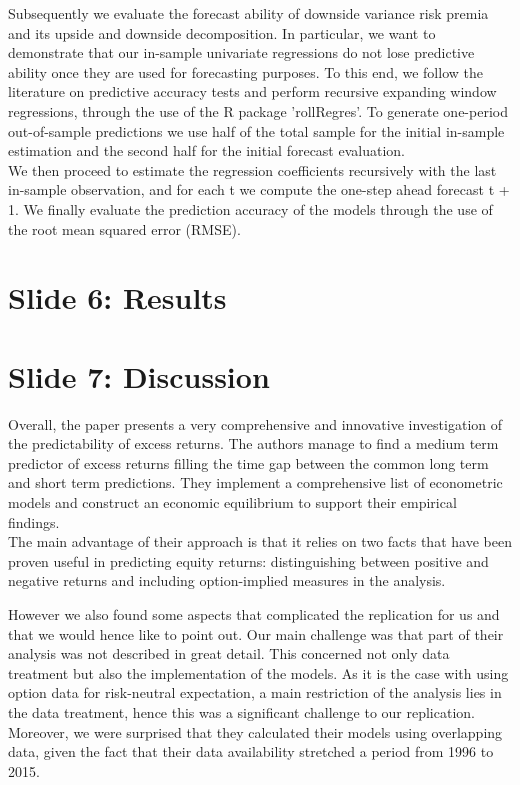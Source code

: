 \documentclass[12pt, letterpaper]{article}
\begin{document}
\vspace{3mm}
\noindent
Subsequently we evaluate the forecast ability of downside variance risk premia and its upside and downside decomposition. In particular, we want to demonstrate that our in-sample univariate regressions do not lose predictive ability once they are used for forecasting purposes.
To this end, we follow the literature on predictive accuracy tests and perform recursive
expanding window regressions, through the use of the R package ’rollRegres’. To generate
one-period out-of-sample predictions we use half of the total sample for
the initial in-sample estimation and the second half for the initial forecast evaluation. \\
We then proceed to estimate the regression coefficients recursively with the last in-sample observation, and for each t we compute the one-step ahead forecast t + 1.
We finally evaluate the prediction accuracy of the models through the use of the root mean squared error (RMSE).

\section{Slide 6: Results}

\section{Slide 7: Discussion}
Overall, the paper presents a very comprehensive and innovative investigation of the predictability of excess returns. The authors manage to find a medium term predictor of excess returns filling the time gap between the common long term and short term predictions. They implement a comprehensive list of econometric models and construct an economic equilibrium to support their empirical findings. \\
The main advantage of their approach is that it relies on two facts that have been proven useful in predicting equity returns: distinguishing between positive and negative returns and including option-implied measures in the analysis.

\vspace{3mm}
\noindent
However we also found some aspects that complicated the replication for us and that we would hence like to point out. Our main challenge was that part of their analysis was not described in great detail. This concerned not only data treatment but also the implementation of the models. As it is the case with using option data for risk-neutral expectation, a main restriction of the analysis lies in the data treatment, hence this was a significant challenge to our replication. Moreover, we were surprised that they calculated their models using overlapping data, given the fact that their data availability stretched a period from 1996 to 2015.
\end{document}
